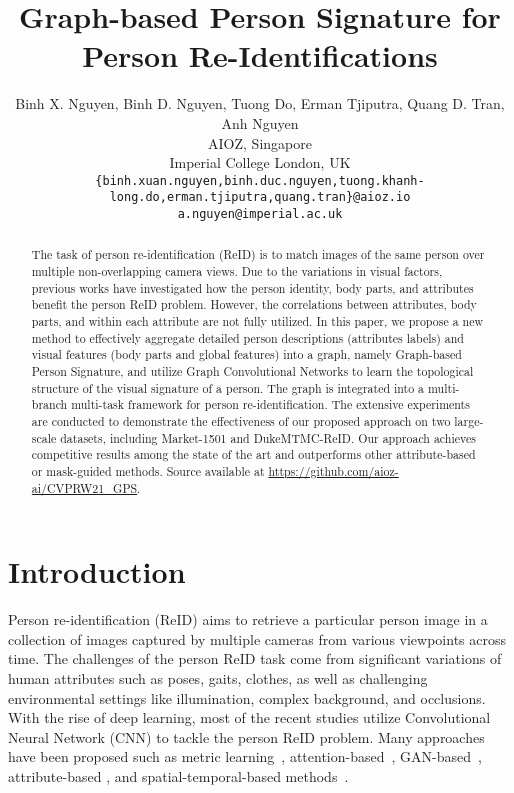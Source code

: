 \documentclass[final]{cvpr}
\begin{document}
\title{Graph-based Person Signature for Person Re-Identifications}
\author{Binh X. Nguyen, Binh D. Nguyen, Tuong Do, Erman Tjiputra, Quang D. Tran, Anh Nguyen\\
{AIOZ, Singapore}\\
{Imperial College London, UK}\\
{\tt\small \{binh.xuan.nguyen,binh.duc.nguyen,tuong.khanh-long.do,erman.tjiputra,quang.tran\}@aioz.io}\\
{\tt\small a.nguyen@imperial.ac.uk}}



\maketitle

\begin{abstract}
The task of person re-identification (ReID) is to match images of the same person over multiple non-overlapping camera views. Due to the variations in visual factors, previous works have investigated how the person identity, body parts, and attributes benefit the person ReID problem. However, the correlations between attributes, body parts, and within each attribute are not fully utilized. In this paper, we propose a new method to effectively aggregate detailed person descriptions (attributes labels) and visual features (body parts and global features) into a graph, namely Graph-based Person Signature, and utilize Graph Convolutional Networks to learn the topological structure of the visual signature of a person. The graph is integrated into a multi-branch multi-task framework for person re-identification. The extensive experiments are conducted to demonstrate the effectiveness of our proposed approach on two large-scale datasets, including Market-1501 and DukeMTMC-ReID. Our approach achieves competitive results among the state of the art and outperforms other attribute-based or mask-guided methods. Source available at \small\url{https://github.com/aioz-ai/CVPRW21_GPS}.
\end{abstract}

\section{Introduction}
\label{sec:intro}
Person re-identification (ReID) aims to retrieve a particular person image in a collection of images captured by multiple cameras from various viewpoints across time. The challenges of the person ReID task come from significant variations of human attributes such as poses, gaits, clothes, as well as challenging environmental settings like illumination, complex background, and occlusions. With the rise of deep learning, most of the recent studies utilize Convolutional Neural Network (CNN) to tackle the person ReID problem. Many approaches have been proposed such as metric learning~\cite{triplet, nguyen2020deep,chen2017beyond}, attention-based~\cite{mancs,sona,scal, nguyen2019v2cnet}, GAN-based~\cite{PN-GAN,FD-GAN,dg-net}, attribute-based \cite{apdr,attreid,a3m,mlfn,affnet,PAAN}, and spatial-temporal-based methods~\cite{st-ReID}.
\end{document}
